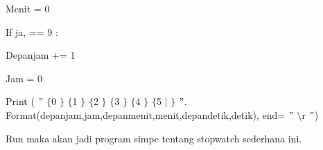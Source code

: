 {\fontsize{14pt}{14pt}\selectfont Menit = 0 \\} \par
\noindent 
{\fontsize{14pt}{14pt}\selectfont If ja, == 9 : \\} \par
\noindent 
{\fontsize{14pt}{14pt}\selectfont Depanjam += 1 \\} \par
\noindent 
{\fontsize{14pt}{14pt}\selectfont Jam = 0 \\} \par
\noindent 
{\fontsize{14pt}{14pt}\selectfont Print ( $ " $ $  \{  $0 $  \}  $ $  \{  $1 $  \}  $ $  \{  $2 $  \}  $ $  \{  $3 $  \}  $ $  \{  $4 $  \}  $ $  \{  $5 $  \vert  $ $  \}  $ $ " $. Format(depanjam,jam,depanmenit,menit,depandetik,detik), end= $ " $ $  \setminus  $r $ " $) \\} \par
\vspace{14pt}
\noindent 
{\fontsize{14pt}{14pt}\selectfont Run maka akan jadi program simpe tentang stopwatch sederhana ini. \\} \par
